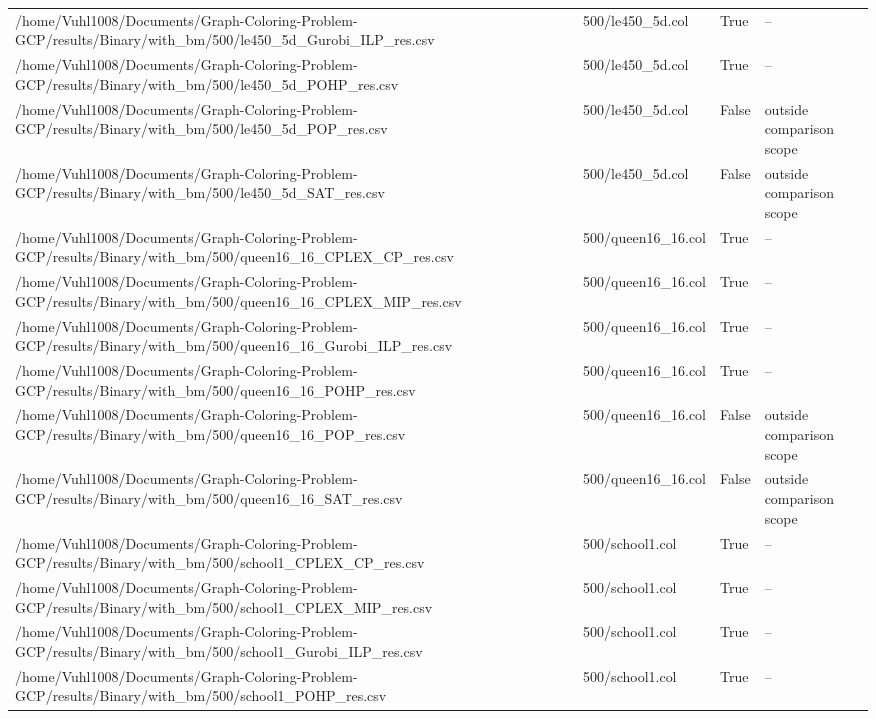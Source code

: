 \begin{table}[htbp]
\begin{tabular}{llll}
/home/Vuhl1008/Documents/Graph-Coloring-Problem-GCP/results/Binary/with\_bm/500/le450\_5d\_Gurobi\_ILP\_res.csv & 500/le450\_5d.col & True & -- \\
/home/Vuhl1008/Documents/Graph-Coloring-Problem-GCP/results/Binary/with\_bm/500/le450\_5d\_POHP\_res.csv & 500/le450\_5d.col & True & -- \\
/home/Vuhl1008/Documents/Graph-Coloring-Problem-GCP/results/Binary/with\_bm/500/le450\_5d\_POP\_res.csv & 500/le450\_5d.col & False & outside comparison scope \\
/home/Vuhl1008/Documents/Graph-Coloring-Problem-GCP/results/Binary/with\_bm/500/le450\_5d\_SAT\_res.csv & 500/le450\_5d.col & False & outside comparison scope \\
/home/Vuhl1008/Documents/Graph-Coloring-Problem-GCP/results/Binary/with\_bm/500/queen16\_16\_CPLEX\_CP\_res.csv & 500/queen16\_16.col & True & -- \\
/home/Vuhl1008/Documents/Graph-Coloring-Problem-GCP/results/Binary/with\_bm/500/queen16\_16\_CPLEX\_MIP\_res.csv & 500/queen16\_16.col & True & -- \\
/home/Vuhl1008/Documents/Graph-Coloring-Problem-GCP/results/Binary/with\_bm/500/queen16\_16\_Gurobi\_ILP\_res.csv & 500/queen16\_16.col & True & -- \\
/home/Vuhl1008/Documents/Graph-Coloring-Problem-GCP/results/Binary/with\_bm/500/queen16\_16\_POHP\_res.csv & 500/queen16\_16.col & True & -- \\
/home/Vuhl1008/Documents/Graph-Coloring-Problem-GCP/results/Binary/with\_bm/500/queen16\_16\_POP\_res.csv & 500/queen16\_16.col & False & outside comparison scope \\
/home/Vuhl1008/Documents/Graph-Coloring-Problem-GCP/results/Binary/with\_bm/500/queen16\_16\_SAT\_res.csv & 500/queen16\_16.col & False & outside comparison scope \\
/home/Vuhl1008/Documents/Graph-Coloring-Problem-GCP/results/Binary/with\_bm/500/school1\_CPLEX\_CP\_res.csv & 500/school1.col & True & -- \\
/home/Vuhl1008/Documents/Graph-Coloring-Problem-GCP/results/Binary/with\_bm/500/school1\_CPLEX\_MIP\_res.csv & 500/school1.col & True & -- \\
/home/Vuhl1008/Documents/Graph-Coloring-Problem-GCP/results/Binary/with\_bm/500/school1\_Gurobi\_ILP\_res.csv & 500/school1.col & True & -- \\
/home/Vuhl1008/Documents/Graph-Coloring-Problem-GCP/results/Binary/with\_bm/500/school1\_POHP\_res.csv & 500/school1.col & True & -- \\

\end{tabular}
\end{table}

